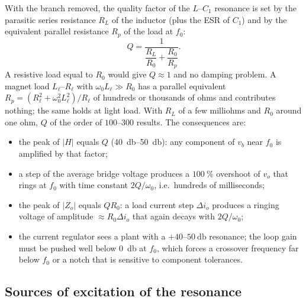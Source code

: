 \documentclass[11pt,a4paper]{article}
\begin{document}
With the branch removed, the quality factor of the $L$--$C_1$ resonance is set by the
parasitic series resistance $R_L$ of the inductor (plus the ESR of $C_1$) and by the
equivalent parallel resistance $R_p$ of the load at $f_0$:
\begin{equation}
Q = \frac{1}{\dfrac{R_L}{R_0} + \dfrac{R_0}{R_p}}.
\label{eq:Qund}
\end{equation}
A resistive load equal to $R_0$ would give $Q \approx 1$ and no damping problem. A magnet
load $L_\ell$--$R_\ell$ with $\omega_0 L_\ell \gg R_0$ has a parallel equivalent
$R_p = (R_\ell^2 + \omega_0^2 L_\ell^2)/R_\ell$ of hundreds or thousands of ohms and
contributes nothing; the same holds at light load. With $R_L$ of a few milliohms and $R_0$
around one ohm, $Q$ of the order of $100$--$300$ results. The consequences are:
\begin{itemize}[nosep]
\item the peak of $|H|$ equals $Q$ (\SIrange{40}{50}{\decibel}): any component of $v_b$
      near $f_0$ is amplified by that factor;
\item a step of the average bridge voltage produces a $\SI{100}{\percent}$ overshoot of
      $v_o$ that rings at $f_0$ with time constant $2Q/\omega_0$, i.e.\ hundreds of
      milliseconds;
\item the peak of $|Z_o|$ equals $Q R_0$: a load current step $\Delta i_o$ produces a
      ringing voltage of amplitude $\approx R_0 \Delta i_o$ that again decays with
      $2Q/\omega_0$;
\item the current regulator sees a plant with a $+40$--$\SI{50}{\decibel}$ resonance; the
      loop gain must be pushed well below \SI{0}{\decibel} at $f_0$, which forces a
      crossover frequency far below $f_0$ or a notch that is sensitive to component
      tolerances.
\end{itemize}

\subsection{Sources of excitation of the resonance}
\end{document}
